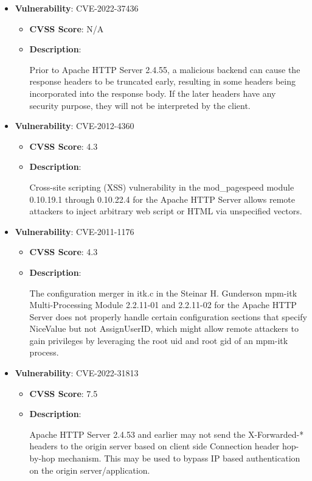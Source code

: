 \documentclass{article}
\begin{document}
\begin{itemize}
        \item \textbf{Vulnerability}: CVE-2022-37436
        \begin{itemize}
            \item \textbf{CVSS Score}:  N/A 
            \item \textbf{Description}:
            \parbox[t]{0.9\linewidth}{
                \ttfamily Prior to Apache HTTP Server 2.4.55, a malicious backend can cause the response headers to be truncated early, resulting in some headers being incorporated into the response body. If the later headers have any security purpose, they will not be interpreted by the client.
            }
        \end{itemize}
    
        \item \textbf{Vulnerability}: CVE-2012-4360
        \begin{itemize}
            \item \textbf{CVSS Score}:  4.3 
            \item \textbf{Description}:
            \parbox[t]{0.9\linewidth}{
                \ttfamily Cross-site scripting (XSS) vulnerability in the mod\_pagespeed module 0.10.19.1 through 0.10.22.4 for the Apache HTTP Server allows remote attackers to inject arbitrary web script or HTML via unspecified vectors.
            }
        \end{itemize}
    
        \item \textbf{Vulnerability}: CVE-2011-1176
        \begin{itemize}
            \item \textbf{CVSS Score}:  4.3 
            \item \textbf{Description}:
            \parbox[t]{0.9\linewidth}{
                \ttfamily The configuration merger in itk.c in the Steinar H. Gunderson mpm-itk Multi-Processing Module 2.2.11-01 and 2.2.11-02 for the Apache HTTP Server does not properly handle certain configuration sections that specify NiceValue but not AssignUserID, which might allow remote attackers to gain privileges by leveraging the root uid and root gid of an mpm-itk process.
            }
        \end{itemize}
    
        \item \textbf{Vulnerability}: CVE-2022-31813
        \begin{itemize}
            \item \textbf{CVSS Score}:  7.5 
            \item \textbf{Description}:
            \parbox[t]{0.9\linewidth}{
                \ttfamily Apache HTTP Server 2.4.53 and earlier may not send the X-Forwarded-* headers to the origin server based on client side Connection header hop-by-hop mechanism. This may be used to bypass IP based authentication on the origin server/application.
            }
        \end{itemize}
    

\end{itemize}
\end{document}
